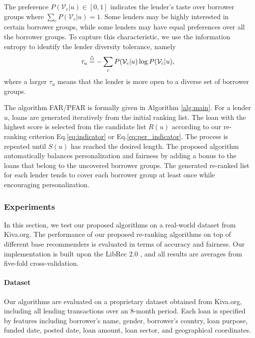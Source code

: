 The preference $P(\mathcal V_c|u)\in [0,1]$ indicates the lender's taste over borrower groups where $\sum_{c} P(\mathcal V_c|u)=1$. Some lenders may be highly interested in certain borrower groups, while some lenders may have equal preferences over all the borrower groups. To capture this characteristic, we use the information entropy \cite{shannon2001mathematical} to identify the lender diversity tolerance, namely
\begin{equation}
\tau_u\buildrel\triangle\over=-\sum_{c}P(\mathcal V_c|u)\log P(\mathcal V_c|u),
\end{equation}
where a larger $\tau_u$ means that the lender is more open to a diverse set of borrower groups.

The algorithm FAR/PFAR is formally given in Algorithm \ref{alg:main}. For a lender $u$, loans are generated iteratively from the initial ranking list. The loan with the highest score is selected from the candidate list $R(u)$ according to our re-ranking criterion Eq.\eqref{eq:indicator} or Eq.\eqref{eq:per_indicator}. The process is repeated until $S(u)$ has reached the desired length. The proposed algorithm automatically balances personalization and fairness by adding a bonus to the loans that belong to the uncovered borrower groups. The generated re-ranked list for each lender tends to cover each borrower group at least once while encouraging personalization.


\subsubsection{\textbf{Experiments}}\label{sect:exp}
\hfill

In this section, we test our proposed algorithms on a real-world dataset from Kiva.org. The performance of our proposed re-ranking algorithms on top of different base recommenders is evaluated in terms of accuracy and fairness. Our implementation is built upon the LibRec 2.0 \cite{guo2015librec}, and all results are averages from five-fold cross-validation.


\paragraph{\textbf{Dataset}}
Our algorithms are evaluated on a proprietary dataset obtained from Kiva.org, including all lending transactions over an 8-month period. Each loan is specified by features including borrower's name, gender, borrower's country, loan purpose, funded date, posted date, loan amount, loan sector, and geographical coordinates.

